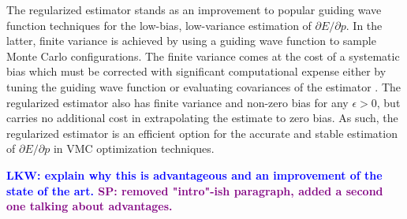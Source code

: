 \documentclass[twocolumn]{revtex4-1}
\newcommand{\lucas}[1]{\textbf{\textcolor{blue}{LKW: #1}}}
\newcommand{\shivesh}[1]{\textbf{\textcolor{purple}{SP: #1}}}
\begin{document}
The regularized estimator stands as an improvement to popular guiding wave function techniques \cite{Avella, Attaccalite2008, Zen2013, Assaraf1999, doi:10.1063/1.1286598, Assaraf2003} for the low-bias, low-variance estimation of $\partial E/\partial p$.
In the latter, finite variance is achieved by using a guiding wave function to sample Monte Carlo configurations.
The finite variance comes at the cost of a systematic bias which must be corrected with significant computational expense either by tuning the guiding wave function or evaluating covariances of the estimator \cite{ Toulouse2015}.
The regularized estimator also has finite variance and non-zero bias for any $\epsilon > 0$, but carries no additional cost in extrapolating the estimate to zero bias.
As such, the regularized estimator is an efficient option for the accurate and stable estimation of $\partial E/\partial p$ in VMC optimization techniques.

\lucas{explain why this is advantageous and an improvement of the state of the art. }
\shivesh{removed "intro"-ish paragraph, added a second one talking about advantages.}

%

\end{document}
